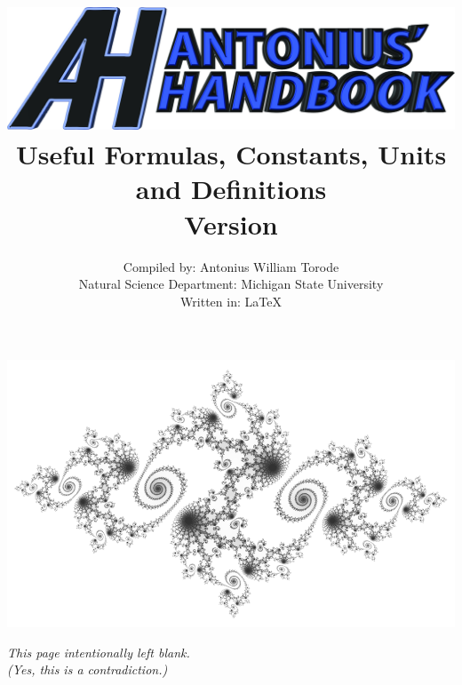 \documentclass[openany,twoside, notitlepage,letterpaper,11pt]{book}
\title{\includegraphics[scale=.15]{./Images/Covers/AH2.jpg}
	\\ \vspace{1.5cm} Useful Formulas, Constants, Units and Definitions \\ Version \Version}
\date{}
\author{Compiled by: Antonius William Torode\\ Natural Science Department: Michigan State University \\ Written in: \LaTeX}
\begin{document}
\frontmatter
\maketitle
\thispagestyle{empty}
\pagestyle{empty}
\begin{center}
	\includegraphics[scale=.4]{./Images/Covers/background.png}
\end{center}





\thispagestyle{empty}
\newpage
{}
\begin{center}
	\textit{This page intentionally left blank.\\ (Yes, this is a contradiction.)}
\end{center}

\tableofcontents


\setlength{\parindent}{0pt}
\mainmatter
\pagestyle{fancy}


\newpage


\newpage


\newpage


\newpage
	

\newpage


\newpage


\newpage

\end{document}
